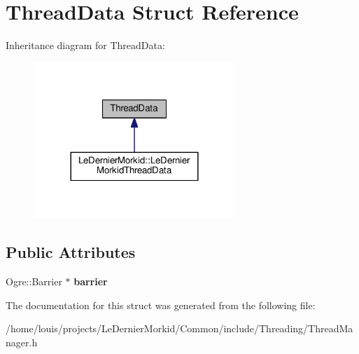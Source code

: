 \hypertarget{struct_thread_data}{}\section{Thread\+Data Struct Reference}
\label{struct_thread_data}


Inheritance diagram for Thread\+Data\+:\nopagebreak
\begin{figure}[H]
\begin{center}
\leavevmode
\includegraphics[width=216pt]{struct_thread_data__inherit__graph}
\end{center}
\end{figure}
\subsection*{Public Attributes}
\begin{DoxyCompactItemize}
\item 
\mbox{\label{struct_thread_data_a09870ee767fb0882817702c7fccce29d}} 
Ogre\+::\+Barrier $\ast$ {\bfseries barrier}
\end{DoxyCompactItemize}


The documentation for this struct was generated from the following file\+:\begin{DoxyCompactItemize}
\item 
/home/louis/projects/\+Le\+Dernier\+Morkid/\+Common/include/\+Threading/Thread\+Manager.\+h\end{DoxyCompactItemize}
